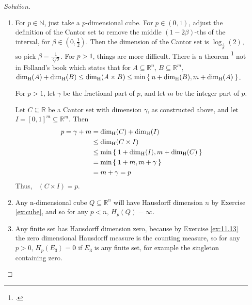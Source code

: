 \documentclass[11pt]{amsart}
\theoremstyle{definition}
\newcommand{\R}{\ensuremath{\mathbb{R}}}
\newcommand{\N}{\ensuremath{\mathbb{N}}}
\DeclareMathOperator{\dimH}{dim_H}
\begin{document}
\begin{proof}[Solution]
	\begin{enumerate}
		\item For \( p \in \N \), just take a \(p\)-dimensional cube. 
		For \( p \in (0, 1)\), adjust the definition of the Cantor set to remove the middle \((1 - 2\beta)\)-ths of the interval, for \( \beta \in \left( 0, \frac{1}{2} \right)\). Then the dimension of the Cantor set is \( \log_{\frac{1}{\beta}}(2) \), so pick \( \beta = \frac{1}{\sqrt[p]{2}}\).
		For \( p > 1\), things are more difficult. There is a theorem \footcite{hatano_1971} not in Folland's book which states that for \( A \subseteq \R^n \), \( B \subseteq \R^m \), \(\dimH (A) + \dimH(B) \leq \dimH( A \times B) \leq \min \Set{ n + \dimH(B), m + \dimH(A) }\). 
		
		For \(p>1\), let \( \gamma \) be the fractional part of \(p\), and let \(m\) be the integer part of \(p\).
		
		Let \(C \subseteq \R \) be a Cantor set with dimension \( \gamma \), as constructed above, and let \( I = [0,1]^m \subseteq \R^m \). Then
		\begin{align}
			p = \gamma + m & = \dimH(C) + \dimH(I) \\
			& \leq \dimH(C \times I) \\
			& \leq \min \Set{ 1 + \dimH(I), m + \dimH(C) } \\
			& = \min \Set{ 1 + m, m + \gamma } \\
			& = m + \gamma = p
		\end{align}
		Thus, \( \dimH(C \times I) = p\).
		\item Any n-dimensional cube \( Q \subseteq \R^n\) will have Hausdorff dimension \(n\) by Exercise \ref{ex:cube}, and so for any \( p < n \), \(H_p(Q) = \infty\).
		\item Any finite set has Hausdorff dimension zero, because by Exercise \ref{ex:11.13} the zero dimensional Hausdorff measure is the counting measure, so for any \(p>0\), \(H_p(E_3) = 0\) if \(E_3\) is any finite set, for example the singleton containing zero.
	\end{enumerate}
	
	
\end{proof}

\medskip


%
%
\end{document}

